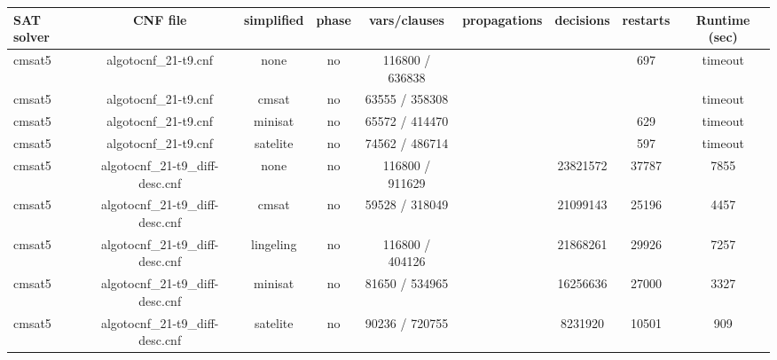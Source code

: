 \begin{appendices}
\begin{table}[p]
  \begin{center}
    \begin{tabular}{l|cccccccc}
        \textbf{SAT solver} & \textbf{CNF file} & \textbf{simplified} & \textbf{phase} & \textbf{vars/clauses} & \textbf{propagations} & \textbf{decisions} & \textbf{restarts} & \textbf{Runtime (sec)} \\
      \hline
  cmsat5                         & algotocnf\_21-t9.cnf           & none       & no    & 116800 / 636838 &           &           & 697        & timeout \\ %
  cmsat5                         & algotocnf\_21-t9.cnf           & cmsat      & no    & 63555 / 358308 &           &           &            & timeout \\ %
  cmsat5                         & algotocnf\_21-t9.cnf           & minisat    & no    & 65572 / 414470 &           &           & 629        & timeout \\ %
  cmsat5                         & algotocnf\_21-t9.cnf           & satelite   & no    & 74562 / 486714 &           &           & 597        & timeout \\ %
  cmsat5                         & algotocnf\_21-t9\_diff-desc.cnf & none       & no    & 116800 / 911629 &           & 23821572  & 37787      & 7855 \\ %
  cmsat5                         & algotocnf\_21-t9\_diff-desc.cnf & cmsat      & no    & 59528 / 318049 &           & 21099143  & 25196      & 4457 \\ %
  cmsat5                         & algotocnf\_21-t9\_diff-desc.cnf & lingeling  & no    & 116800 / 404126 &           & 21868261  & 29926      & 7257 \\ %
  cmsat5                         & algotocnf\_21-t9\_diff-desc.cnf & minisat    & no    & 81650 / 534965 &           & 16256636  & 27000      & 3327 \\ %
  cmsat5                         & algotocnf\_21-t9\_diff-desc.cnf & satelite   & no    & 90236 / 720755 &           & 8231920   & 10501      & 909 \\ %

\end{tabular}
\end{center}
\end{table}
\end{appendices}

